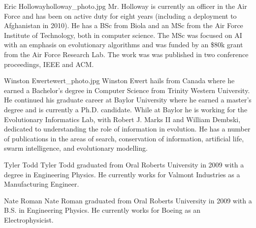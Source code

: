 \begin{authorbio}{Eric Holloway}{holloway_photo.jpg}{}
Mr. Holloway is currently an officer in the Air Force and has been on
active duty for eight years (including a deployment to Afghanistan in
2010). He has a BSc from Biola and an MSc from the Air Force Institute
of Technology, both in computer science. The MSc was focused on AI
with an emphasis on evolutionary algorithms and was funded by an \$80k
grant from the Air Force Research Lab. The work was was published in
two conference proceedings, IEEE and ACM.
\end{authorbio}

\begin{authorbio}{Winston Ewert}{ewert_photo.jpg}{}
Winston Ewert hails from Canada where he earned a Bachelor's degree in Computer Science from Trinity Western University. He continued his graduate career at Baylor University where he earned a master's degree and is currently a Ph.D. candidate. While at Baylor he is working for the Evolutionary Informatics Lab, with Robert J. Marks II and William Dembski, dedicated to understanding the role of information in evolution. He has a number of publications in the areas of search, conservation of information, artificial life, swarm intelligence, and evolutionary modelling. 
\end{authorbio}

\begin{authorbio}{Tyler Todd}{}{}
Tyler Todd graduated from Oral Roberts University in 2009 with a degree in Engineering Physics.  He currently works for Valmont Industries as a Manufacturing Engineer.
\end{authorbio}

\begin{authorbio}{Nate Roman}{}{}
Nate Roman graduated from Oral Roberts University in 2009 with a B.S. in Engineering Physics.  He currently works for Boeing as an Electrophysicist.
\end{authorbio}

